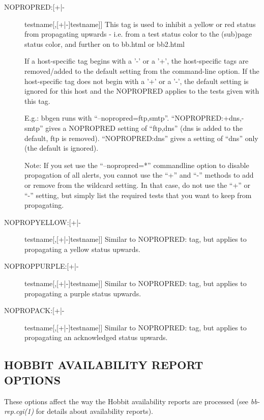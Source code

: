  \begin{description}
\item[NOPROPRED:[+|-]testname[,[+|-]testname]] This tag is used to
  inhibit a yellow or red status from propagating upwards - i.e. from
  a test status color to the (sub)page status color, and further on to
  bb.html or bb2.html 


  If a host-specific tag begins with a '-' or a '+', the host-specific
  tags are removed/added to the default setting from the command-line
  option. If the host-specific tag does not begin with a '+' or a '-',
  the default setting is ignored for this host and the NOPROPRED
  applies to the tests given with this tag. 



  E.g.: bbgen runs with
  ``--nopropred=ftp,smtp''. ``NOPROPRED:+dns,-smtp'' gives a NOPROPRED
  setting of ``ftp,dns'' (dns is added to the default, ftp is
  removed). ``NOPROPRED:dns'' gives a setting of ``dns'' only (the
  default is ignored). 



  Note: If you set use the ``--nopropred=*'' commandline option to
  disable propagation of all alerts, you cannot use the ``+'' and
  ``-'' methods to add or remove from the wildcard setting. In that
  case, do not use the ``+'' or ``-'' setting, but simply list the
  required tests that you want to keep from propagating. 


\item[NOPROPYELLOW:[+|-]testname[,[+|-]testname]] Similar to
  NOPROPRED: tag, but applies to propagating a yellow status upwards. 


\item[NOPROPPURPLE:[+|-]testname[,[+|-]testname]] Similar to
  NOPROPRED: tag, but applies to propagating a purple status upwards. 


 

\item[NOPROPACK:[+|-]testname[,[+|-]testname]] Similar to NOPROPRED:
  tag, but applies to propagating an acknowledged status upwards. 


\end{description}

\subsection{HOBBIT AVAILABILITY REPORT OPTIONS}
 These options affect the way the Hobbit availability reports are processed (see \emph{bb-rep.cgi(1)}
 for details about availability reports). 

